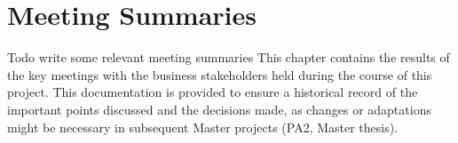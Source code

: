 \chapter{Meeting Summaries}

Todo
write some relevant meeting summaries
This chapter contains the results of the key meetings with the business stakeholders held during the course of this project. This documentation is provided to ensure a historical record of the important points discussed and the decisions made, as changes or adaptations might be necessary in subsequent Master projects (PA2, Master thesis).
